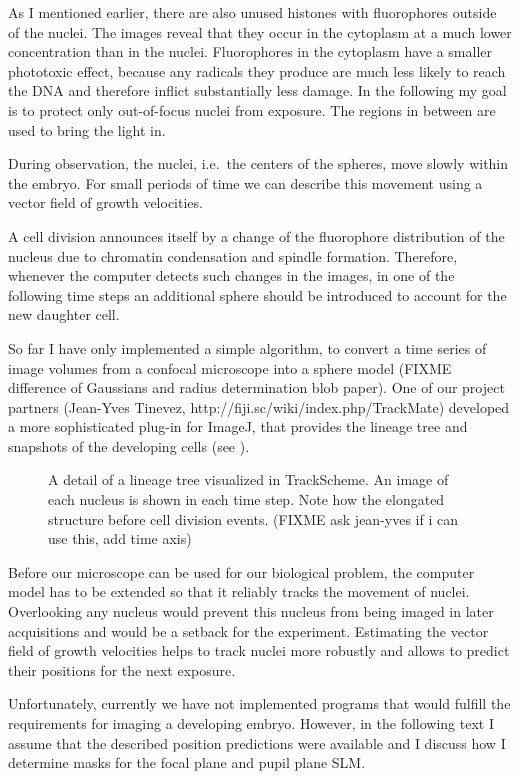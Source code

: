As I mentioned earlier, there are also unused histones with
fluorophores outside of the nuclei. The images reveal that they occur
in the cytoplasm at a much lower concentration than in the
nuclei. Fluorophores in the cytoplasm have a smaller phototoxic
effect, because any radicals they produce are much less likely to
reach the DNA and therefore inflict substantially less damage.  In the
following my goal is to protect only out-of-focus nuclei from
exposure. The regions in between are used to bring the light in.


During observation, the nuclei, i.e.\ the centers of the spheres, move
slowly within the embryo. For small periods of time we can describe
this movement using a vector field of growth velocities.

A cell division announces itself by a change of the fluorophore
distribution of the nucleus due to chromatin condensation and spindle
formation. Therefore, whenever the computer detects such changes in
the images, in one of the following time steps an additional sphere
should be introduced to account for the new daughter cell.

So far I have only implemented a simple algorithm, to convert a time
series of image volumes from a confocal microscope into a sphere model
(FIXME difference of Gaussians and radius determination blob paper).
One of our project partners (Jean-Yves Tinevez,
http://fiji.sc/wiki/index.php/TrackMate) developed a more
sophisticated plug-in for ImageJ, that provides the lineage tree and
snapshots of the developing cells (see ).
\begin{figure}[!hbt] \centering
{}
  \caption{ A detail of a lineage tree visualized in TrackScheme. An
image of each nucleus is shown in each time step. Note how the
elongated structure before cell division events. (FIXME ask jean-yves
if i can use this, add time axis)}
  \label{fig:trackmate}
\end{figure} Before our microscope can be used for our biological
problem, the computer model has to be extended so that it reliably
tracks the movement of nuclei.  Overlooking any nucleus would prevent
this nucleus from being imaged in later acquisitions and would be a
setback for the experiment.  Estimating the vector field of growth
velocities helps to track nuclei more robustly and allows to predict
their positions for the next exposure.

Unfortunately, currently we have not implemented programs that would
fulfill the requirements for imaging a developing embryo.  However, in
the following text I assume that the described position predictions
were available and I discuss how I determine masks for the focal plane
and pupil plane SLM.

